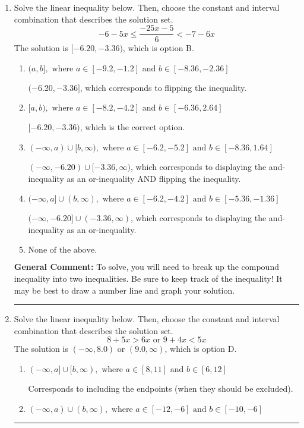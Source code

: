 \documentclass{extbook}[14pt]
\newcommand{\litem}[1]{\item #1

\rule{\textwidth}{0.4pt}}
\begin{document}
\begin{enumerate}
{\textbf{General Comment:} When thinking about this language, it helps to draw a number line and try points.
}
\litem{
Solve the linear inequality below. Then, choose the constant and interval combination that describes the solution set.
\[ -6 - 5 x \leq \frac{-25 x - 5}{6} < -7 - 6 x \]
The solution is \( [-6.20, -3.36) \), which is option B.\begin{enumerate}[label=\Alph*.]
\item \( (a, b], \text{ where } a \in [-9.2, -1.2] \text{ and } b \in [-8.36, -2.36] \)

$(-6.20, -3.36]$, which corresponds to flipping the inequality.
\item \( [a, b), \text{ where } a \in [-8.2, -4.2] \text{ and } b \in [-6.36, 2.64] \)

$[-6.20, -3.36)$, which is the correct option.
\item \( (-\infty, a) \cup [b, \infty), \text{ where } a \in [-6.2, -5.2] \text{ and } b \in [-8.36, 1.64] \)

$(-\infty, -6.20) \cup [-3.36, \infty)$, which corresponds to displaying the and-inequality as an or-inequality AND flipping the inequality.
\item \( (-\infty, a] \cup (b, \infty), \text{ where } a \in [-6.2, -4.2] \text{ and } b \in [-5.36, -1.36] \)

$(-\infty, -6.20] \cup (-3.36, \infty)$, which corresponds to displaying the and-inequality as an or-inequality.
\item \( \text{None of the above.} \)


\end{enumerate}

\textbf{General Comment:} To solve, you will need to break up the compound inequality into two inequalities. Be sure to keep track of the inequality! It may be best to draw a number line and graph your solution.
}
\litem{
Solve the linear inequality below. Then, choose the constant and interval combination that describes the solution set.
\[ 8 + 5 x > 6 x \text{ or } 9 + 4 x < 5 x \]
The solution is \( (-\infty, 8.0) \text{ or } (9.0, \infty) \), which is option D.\begin{enumerate}[label=\Alph*.]
\item \( (-\infty, a] \cup [b, \infty), \text{ where } a \in [8, 11] \text{ and } b \in [6, 12] \)

Corresponds to including the endpoints (when they should be excluded).
\item \( (-\infty, a) \cup (b, \infty), \text{ where } a \in [-12, -6] \text{ and } b \in [-10, -6] \)


\end{enumerate}}
\end{enumerate}
\end{document}

